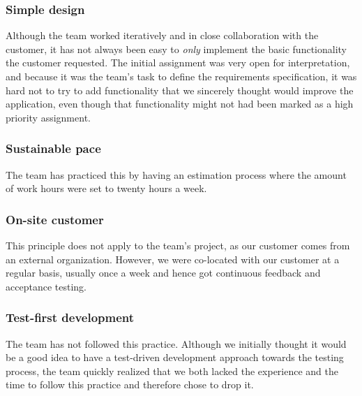 \subsubsection{Simple design}
Although the team worked iteratively and in close collaboration with the customer, it has not always been easy to \emph{only} implement the basic functionality the customer requested. The initial assignment was very open for interpretation, and because it was the team's task to define the requirements specification, it was hard not to try to add functionality that we sincerely thought would improve the application, even though that functionality might not had been marked as a high priority assignment.

\subsubsection{Sustainable pace}
The team has practiced this by having an estimation process where the amount of work hours were set to twenty hours a week.

\subsubsection{On-site customer}
This principle does not apply to the team's project, as our customer comes from an external organization. However, we were co-located with our customer at a regular basis, usually once a week and hence got continuous feedback and acceptance testing.

\subsubsection{Test-first development}
The team has not followed this practice. Although we initially thought it would be a good idea to have a test-driven development approach towards the testing process, the team quickly realized that we both lacked the experience and the time to follow this practice and therefore chose to drop it.

